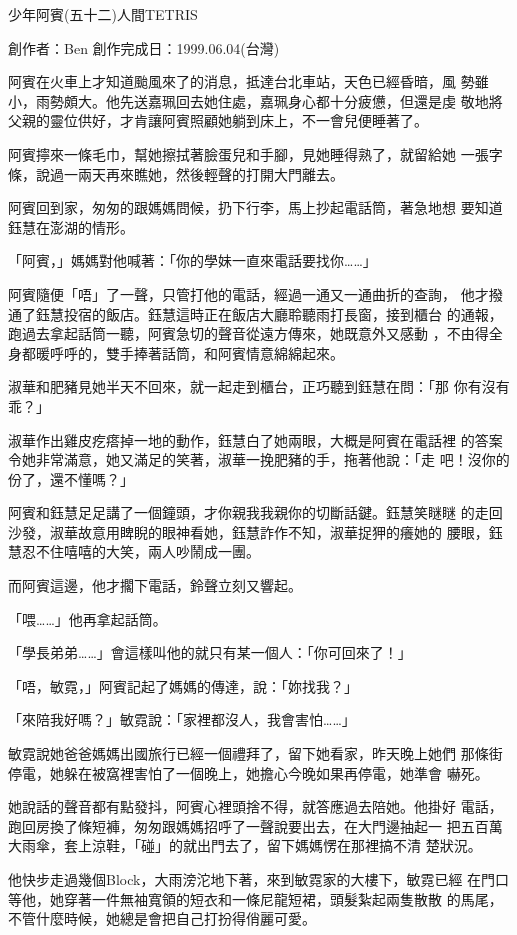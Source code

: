 



少年阿賓(五十二)人間TETRIS

創作者：Ben
創作完成日：1999.06.04(台灣)


阿賓在火車上才知道颱風來了的消息，抵達台北車站，天色已經昏暗，風
勢雖小，雨勢頗大。他先送嘉珮回去她住處，嘉珮身心都十分疲憊，但還是虔
敬地將父親的靈位供好，才肯讓阿賓照顧她躺到床上，不一會兒便睡著了。

阿賓擰來一條毛巾，幫她擦拭著臉蛋兒和手腳，見她睡得熟了，就留給她
一張字條，說過一兩天再來瞧她，然後輕聲的打開大門離去。

阿賓回到家，匆匆的跟媽媽問候，扔下行李，馬上抄起電話筒，著急地想
要知道鈺慧在澎湖的情形。

「阿賓，」媽媽對他喊著：「你的學妹一直來電話要找你……」

阿賓隨便「唔」了一聲，只管打他的電話，經過一通又一通曲折的查詢，
他才撥通了鈺慧投宿的飯店。鈺慧這時正在飯店大廳聆聽雨打長窗，接到櫃台
的通報，跑過去拿起話筒一聽，阿賓急切的聲音從遠方傳來，她既意外又感動
，不由得全身都暖呼呼的，雙手捧著話筒，和阿賓情意綿綿起來。

淑華和肥豬見她半天不回來，就一起走到櫃台，正巧聽到鈺慧在問：「那
你有沒有乖？」

淑華作出雞皮疙瘩掉一地的動作，鈺慧白了她兩眼，大概是阿賓在電話裡
的答案令她非常滿意，她又滿足的笑著，淑華一挽肥豬的手，拖著他說：「走
吧！沒你的份了，還不懂嗎？」

阿賓和鈺慧足足講了一個鐘頭，才你親我我親你的切斷話鍵。鈺慧笑瞇瞇
的走回沙發，淑華故意用睥睨的眼神看她，鈺慧詐作不知，淑華捉狎的癢她的
腰眼，鈺慧忍不住嘻嘻的大笑，兩人吵鬧成一團。

而阿賓這邊，他才擱下電話，鈴聲立刻又響起。

「喂……」他再拿起話筒。

「學長弟弟……」會這樣叫他的就只有某一個人：「你可回來了！」

「唔，敏霓，」阿賓記起了媽媽的傳達，說：「妳找我？」

「來陪我好嗎？」敏霓說：「家裡都沒人，我會害怕……」

敏霓說她爸爸媽媽出國旅行已經一個禮拜了，留下她看家，昨天晚上她們
那條街停電，她躲在被窩裡害怕了一個晚上，她擔心今晚如果再停電，她準會
嚇死。

她說話的聲音都有點發抖，阿賓心裡頭捨不得，就答應過去陪她。他掛好
電話，跑回房換了條短褲，匆匆跟媽媽招呼了一聲說要出去，在大門邊抽起一
把五百萬大雨傘，套上涼鞋，「碰」的就出門去了，留下媽媽愣在那裡搞不清
楚狀況。

他快步走過幾個Block，大雨滂沱地下著，來到敏霓家的大樓下，敏霓已經
在門口等他，她穿著一件無袖寬領的短衣和一條尼龍短裙，頭髮紮起兩隻散散
的馬尾，不管什麼時候，她總是會把自己打扮得俏麗可愛。

